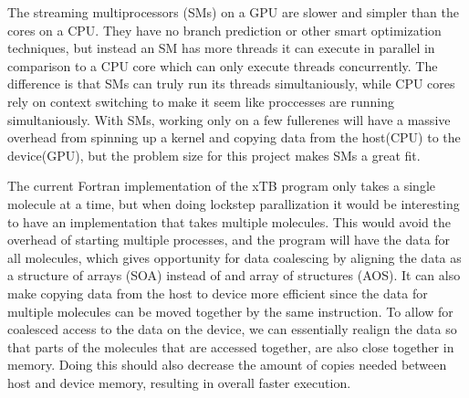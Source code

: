The streaming multiprocessors (SMs) on a GPU are slower and simpler than the cores on a CPU. They have no branch prediction or other smart optimization techniques, but instead an SM has more threads it can execute in parallel in comparison to a CPU core which can only execute threads concurrently. The difference is that SMs can truly run its threads simultaniously, while CPU cores rely on context switching to make it seem like proccesses are running simultaniously. With SMs, working only on a few fullerenes will have a massive overhead from spinning up a kernel and copying data from the host(CPU) to the device(GPU), but the problem size for this project makes SMs a great fit.

The current Fortran implementation of the xTB program only takes a single molecule at a time, but when doing lockstep parallization it would be interesting to have an implementation that takes multiple molecules. This would avoid the overhead of starting multiple processes, and the program will have the data for all molecules, which gives opportunity for data coalescing by aligning the data as a structure of arrays (SOA) instead of and array of structures (AOS). It can also make copying data from the host to device more efficient since the data for multiple molecules can be moved together by the same instruction. To allow for coalesced access to the data on the device, we can essentially realign the data so that parts of the molecules that are accessed together, are also close together in memory. Doing this should also decrease the amount of copies needed between host and device memory, resulting in overall faster execution.

